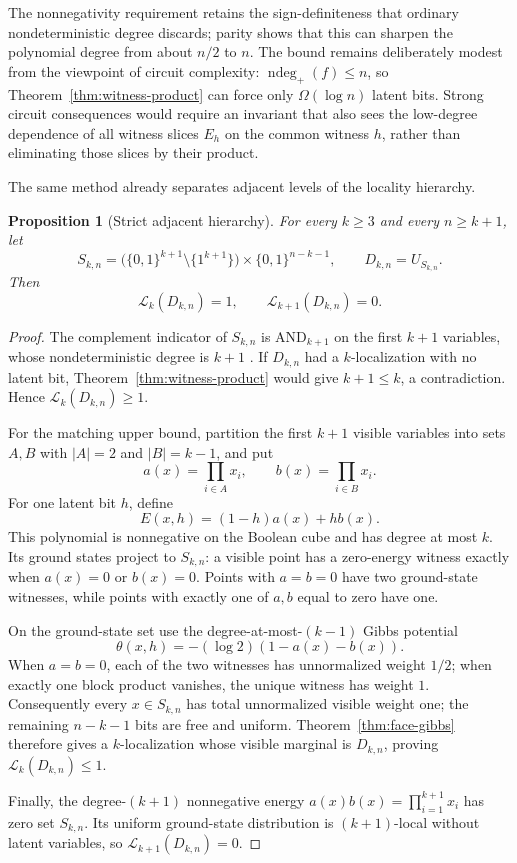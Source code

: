 \documentclass{article}
\newcommand{\LC}{\mathcal{L}}
\newcommand{\ndeg}{\operatorname{ndeg}}
\newcommand{\bits}{\{0,1\}}
\newtheorem{proposition}{Proposition}
\begin{document}
The nonnegativity requirement retains the sign-definiteness that
ordinary nondeterministic degree discards; parity shows that this can sharpen
the polynomial degree from about $n/2$ to $n$.  The bound remains deliberately
modest from the viewpoint of circuit complexity: $\ndeg_+(f)\le n$, so
Theorem~\ref{thm:witness-product} can force only $\Omega(\log n)$ latent bits.
Strong circuit consequences would require an invariant that also sees the
low-degree dependence of all witness slices $E_h$ on the common witness $h$,
rather than eliminating those slices by their product.

The same method already separates adjacent levels of the locality hierarchy.

\begin{proposition}[Strict adjacent hierarchy]\label{prop:hierarchy}
For every $k\ge3$ and every $n\ge k+1$, let
\[
  S_{k,n}
  =\bigl(\bits^{k+1}\setminus\{1^{k+1}\}\bigr)
    \times\bits^{n-k-1},
  \qquad D_{k,n}=U_{S_{k,n}}.
\]
Then
\[
  \LC_k(D_{k,n})=1,
  \qquad
  \LC_{k+1}(D_{k,n})=0.
\]
\end{proposition}

\begin{proof}
The complement indicator of $S_{k,n}$ is $\mathrm{AND}_{k+1}$ on the first
$k+1$ variables, whose nondeterministic degree is $k+1$ \cite{dewolf03}.  If
$D_{k,n}$ had a
$k$-localization with no latent bit, Theorem~\ref{thm:witness-product} would
give $k+1\le k$, a contradiction.  Hence $\LC_k(D_{k,n})\ge1$.

For the matching upper bound, partition the first $k+1$ visible variables into
sets
$A,B$ with $|A|=2$ and $|B|=k-1$, and put
\[
  a(x)=\prod_{i\in A}x_i,
  \qquad b(x)=\prod_{i\in B}x_i.
\]
For one latent bit $h$, define
\[
  E(x,h)=(1-h)a(x)+h b(x).
\]
This polynomial is nonnegative on the Boolean cube and has degree at most $k$.
Its ground states project to $S_{k,n}$: a visible point has a zero-energy witness
exactly when $a(x)=0$ or $b(x)=0$.  Points with $a=b=0$ have two ground-state
witnesses, while points with exactly one of $a,b$ equal to zero have one.

On the ground-state set use the degree-at-most-$(k-1)$ Gibbs potential
\[
  \theta(x,h)=-(\log 2)(1-a(x)-b(x)).
\]
When $a=b=0$, each of the two witnesses has unnormalized weight $1/2$; when
exactly one block product vanishes, the unique witness has weight $1$.
Consequently every $x\in S_{k,n}$ has total unnormalized visible weight one;
the remaining $n-k-1$ bits are free and uniform.
Theorem~\ref{thm:face-gibbs} therefore gives a $k$-localization whose visible
marginal is $D_{k,n}$, proving $\LC_k(D_{k,n})\le1$.

Finally, the degree-$(k+1)$ nonnegative energy
$a(x)b(x)=\prod_{i=1}^{k+1}x_i$ has zero set $S_{k,n}$.  Its uniform ground-state
distribution is $(k+1)$-local without latent variables, so
$\LC_{k+1}(D_{k,n})=0$.
\end{proof}
\end{document}
